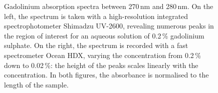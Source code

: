 \begin{figure}
	\centering
	\resizebox{0.49\linewidth}{!}{}
	\resizebox{0.49\linewidth}{!}{}
	\caption[Gadolinium absorption spectra]%
	{Gadolinium absorption spectra between 270\,nm and 280\,nm.
	On the left, the spectrum is taken with a high-resolution integrated spectrophotometer %
	Shimadzu UV-2600, revealing numerous peaks in the region of interest for an aqueous solution %
	of 0.2\,\% gadolinium sulphate.
	On the right, the spectrum is recorded with a fast spectrometer Ocean HDX, varying the concentration 
	from 0.2\,\% down to 0.02\,\%: the height of the peaks scales linearly with the concentration.
	In both figures, the absorbance is normalised to the length of the sample.}
	\label{fig:gad_lines}
\end{figure}


